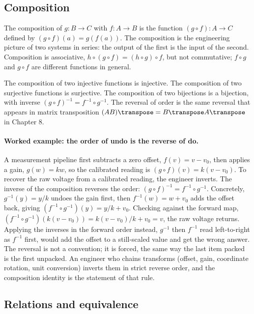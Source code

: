 \subsection{Composition}

The composition of $g : B \to C$ with $f : A \to B$ is the function
$(g \circ f) : A \to C$ defined by $(g \circ f)(a) = g(f(a))$. The
composition is the engineering picture of two systems in series: the
output of the first is the input of the second. Composition is
associative, $h \circ (g \circ f) = (h \circ g) \circ f$, but not
commutative; $f \circ g$ and $g \circ f$ are different functions in
general.

The composition of two injective functions is injective. The
composition of two surjective functions is surjective. The
composition of two bijections is a bijection, with inverse $(g \circ
f)^{-1} = f^{-1} \circ g^{-1}$. The reversal of order is the same
reversal that appears in matrix transposition $(AB)\transpose =
B\transpose A\transpose$ in Chapter 8.

\paragraph{Worked example: the order of undo is the reverse of do.} A
measurement pipeline first subtracts a zero offset, $f(v) = v - v_{0}$,
then applies a gain, $g(w) = k w$, so the calibrated reading is $(g \circ
f)(v) = k(v - v_{0})$. To recover the raw voltage from a calibrated
reading, the engineer inverts. The inverse of the composition reverses
the order: $(g \circ f)^{-1} = f^{-1} \circ g^{-1}$. Concretely,
$g^{-1}(y) = y/k$ undoes the gain first, then $f^{-1}(w) = w + v_{0}$
adds the offset back, giving $(f^{-1} \circ g^{-1})(y) = y/k + v_{0}$.
Checking against the forward map, $(f^{-1} \circ g^{-1})(k(v - v_{0})) =
k(v - v_{0})/k + v_{0} = v$, the raw voltage returns. Applying the
inverses in the forward order instead, $g^{-1}$ then $f^{-1}$ read
left-to-right as $f^{-1}$ first, would add the offset to a still-scaled
value and get the wrong answer. The reversal is not a convention; it is
forced, the same way the last item packed is the first unpacked. An
engineer who chains transforms (offset, gain, coordinate rotation,
unit conversion) inverts them in strict reverse order, and the composition
identity is the statement of that rule.

\subsection{Relations and equivalence}

